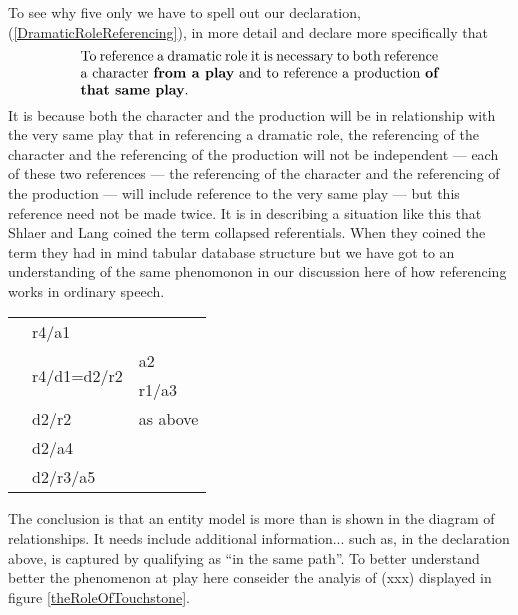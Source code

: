 To see why five only we have to spell out our declaration, (\ref{DramaticRoleReferencing}), in more detail
and declare more specifically that
\begin{equation}
\label{DramaticRoleReferencingRevised}
\text{\parbox{9cm}{To reference a dramatic role it is necessary 
to both reference a character \textbf{from a play} and to reference a production \textbf{of that same play}.}}
\end{equation}
It is because both the character and the production will be in relationship with the very same play
that in referencing a dramatic role, the referencing of the character and the referencing of
the production will not be independent
--- each of these two references --- the referencing of the character and the referencing of the production ---
 will include reference to the very same play --- but this reference need not be made twice. 
It is in describing a situation like this that Shlaer and Lang coined the term collapsed referentials. 
 When they coined the term they had in mind tabular database structure 
 but we have got to an understanding of the same phenomonon in our discussion here 
 of how referencing works in ordinary speech. 
\mynote
\begin{tabular}{l l l}
& r4/a1 &    \\
& \multirow[t]{2}{1cm}{r4/d1=d2/r2} & a2  \\
&                                 & r1/a3 \\
& d2/r2    & as above\\
& d2/a4 &            \\
& d2/r3/a5 &      
\end{tabular}
\mynote
The conclusion is that an entity model is more than is shown in the diagram of relationships. It needs include additional information... such as, in the declaration above,
 is captured by qualifying as ``in the same path''. 
 \mynote
To better understand better the phenomenon at play here conseider the analyis 
of (xxx) displayed in figure \ref{theRoleOfTouchstone}.
